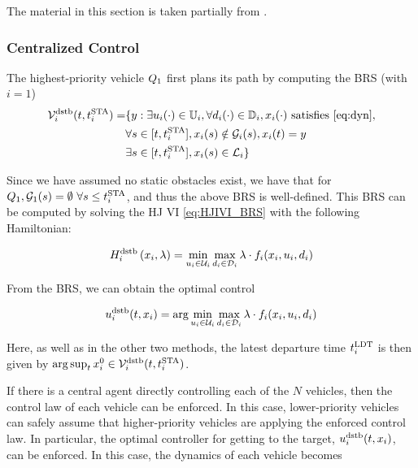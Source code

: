 The material in this section is taken partially from \cite{Bansal2017}.

\subsubsection{Centralized Control \label{sec:cc}}
The highest-priority vehicle $Q_1$ first plans its path by computing the BRS (with $i=1$)
\begin{equation}
\label{eq:BRS}
\begin{aligned}
\brs_i^\text{dstb}(t, \sta_i) = & \{y: \exists \ctrl_i(\cdot) \in \cfset_i, \forall \dstb_i(\cdot) \in \dfset_i, \state_i(\cdot) \text{ satisfies \eqref{eq:dyn}},\\
& \forall s \in [t, \sta_i], \state_i(s) \notin \obsset_i(s), \state_i(t) = y\\
& \exists s \in [t, \sta_i], \state_i(s) \in \targetset_i\}
\end{aligned}
\end{equation}

Since we have assumed no static obstacles exist, we have that for $Q_1, \mathcal{G}_1(s)=\emptyset ~ \forall s \le t^\text{STA}_i$, and thus the above BRS is well-defined. This BRS can be computed by solving the HJ VI \eqref{eq:HJIVI_BRS} with the following Hamiltonian:

\begin{equation}
H_i^\text{dstb}\left(x_i, \lambda\right) = \min_{u_i \in \mathcal{U}_i} \max_{d_i \in \mathcal{D}_i} \lambda \cdot f_i(x_i, u_i, d_i)
\end{equation}

From the BRS, we can obtain the optimal control

\begin{equation}
\label{eq:opt_ctrl_i}
\ctrl_i^\text{dstb}(t,\state_i) =  \arg \min_{\ctrl_i \in \cset_i} \max_{\dstb_i \in \dset_i} \costate \cdot \fdyn_i(\state_i, \ctrl_i, \dstb_i)
\end{equation}

Here, as well as in the other two methods, the latest departure time $t^\text{LDT}_i$ is then given by $\arg \sup_t x_{i}^0 \in \mathcal{V}_i^\text{dstb}(t, t^\text{STA}_i)$.

If there is a central agent directly controlling each of the $N$ vehicles, then the control law of each vehicle can be enforced. In this case, lower-priority vehicles can safely assume that higher-priority vehicles are applying the enforced control law. In particular, the optimal controller for getting to the target, $u^\text{dstb}_i(t, x_i)$, can be enforced. In this case, the dynamics of each vehicle becomes 

